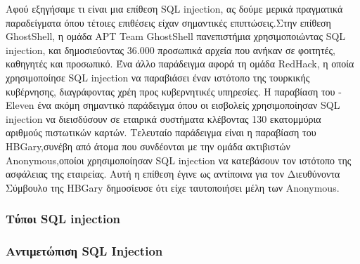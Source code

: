 Αφού εξηγήσαμε τι είναι μια επίθεση SQL injection, ας δούμε μερικά πραγματικά παραδείγματα όπου τέτοιες επιθέσεις είχαν σημαντικές επιπτώσεις.Στην επίθεση \lt GhostShell\gt, η ομάδα \lt APT Team GhostShell  πανεπιστήμια χρησιμοποιώντας \lt SQL injection,  και δημοσιεύοντας 36.000 προσωπικά αρχεία που ανήκαν σε φοιτητές, καθηγητές και προσωπικό. Ένα άλλο παράδειγμα αφορά τη ομάδα \lt RedHack\gt, η οποία χρησιμοποίησε \lt SQL injection  να παραβιάσει έναν ιστότοπο της τουρκικής κυβέρνησης, διαγράφοντας χρέη προς κυβερνητικές υπηρεσίες. Η παραβίαση του -Eleven  ένα ακόμη σημαντικό παράδειγμα όπου οι εισβολείς χρησιμοποίησαν \lt SQL injection  να διεισδύσουν σε εταιρικά συστήματα κλέβοντας 130 εκατομμύρια αριθμούς πιστωτικών καρτών. Τελευταίο παράδειγμα είναι η παραβίαση του \lt HBGary, συνέβη από άτομα  που συνδέονται με την ομάδα ακτιβιστών \lt Anonymous, οποίοι χρησιμοποίησαν \lt SQL injection  να κατεβάσουν τον ιστότοπο της  ασφάλειας της εταιρείας. Αυτή η επίθεση έγινε ως αντίποινα για τον Διευθύνοντα Σύμβουλο της \lt HBGary  δημοσίευσε ότι είχε ταυτοποιήσει μέλη των \lt Anonymous.\gt


\subsubsection{Τύποι \lt SQL injection}
\subsubsection{Αντιμετώπιση \lt SQL Injection}

